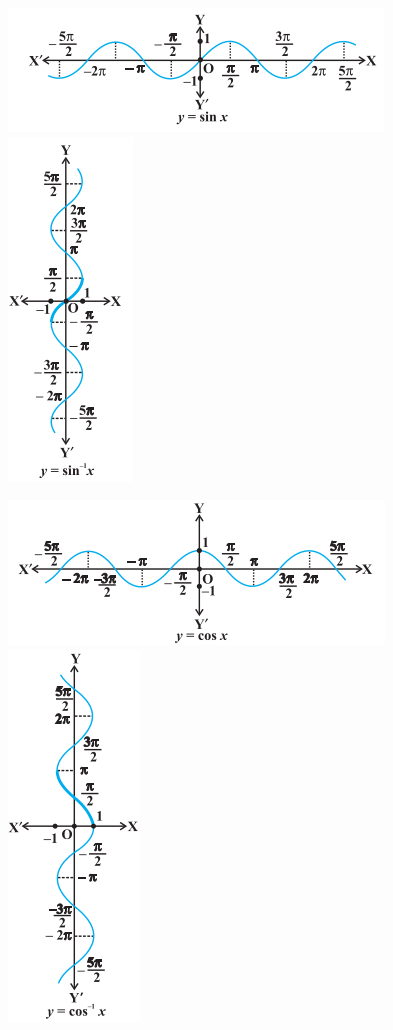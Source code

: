 \documentclass[12pt]{article}
\begin{document}
\begin{multicols}{2}
\includegraphics[scale=0.5]{2.png}
\includegraphics[scale=0.5]{21.png}

\includegraphics[scale=0.5]{3.png}
\includegraphics[scale=0.5]{31.png}


\end{multicols}
\end{document}
